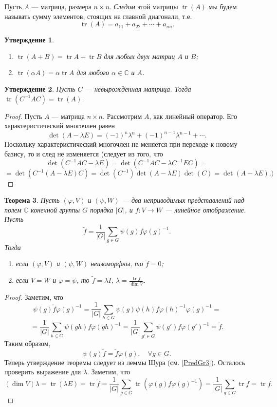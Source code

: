 \documentclass[12pt, titlepage, oneside]{amsbook}
\newcommand{\tr}{\operatorname{tr}}
\newcommand{\CC}{\mathbb{C}}
\newtheorem{theorem}{Теорема}[chapter]
\newtheorem{claim}[theorem]{Утверждение}
\theoremstyle{definition}
\theoremstyle{remark}
\begin{document}
Пусть $A$ --- матрица, размера $n\times n$. \emph{Следом} этой матрицы $\tr(A)$ мы будем называть сумму элементов, стоящих на главной диагонали, т.е. $$\tr(A)=a_{11}+a_{22}+\cdots+a_{nn}.$$

\begin{claim}
	\label{Tr1}
	\begin{enumerate}
		\item $\tr(A+B)=\tr A+\tr B$ для любых двух матриц $A$ и $B$;
		\item $\tr(\alpha A)=\alpha\tr A$ для любого $\alpha\in\CC$ и $A$.
	\end{enumerate}
\end{claim}

\begin{claim}
	\label{Tr2}
	Пусть $C$ --- невырожденная матрица. Тогда $\tr(C^{-1}AC)=\tr(A)$.
\end{claim}

\begin{proof}
	Пусть $A$ --- матрица $n\times n$. Рассмотрим $A$, как линейный оператор. Его характеристический многочлен равен $$\det(A-\lambda E)=(-1)^n\lambda^n+(-1)^{n-1}\lambda^{n-1}+\cdots.$$ Поскольку характеристический многочлен не меняется при переходе к новому базису, то и след не изменяется (следует из того, что $$\det(C^{-1}AC-\lambda E)=\det(C^{-1}AC-\lambda C^{-1}EC)=$$ $$=\det(C^{-1}(A-\lambda E)C)=\det(C^{-1})\det(A-\lambda E)\det(C)=\det(A-\lambda E).)$$
\end{proof}

\begin{theorem}
	\label{PredGr4}
	Пусть $(\varphi,V)$ и $(\psi,W)$ --- два неприводимых представлений над полем $\CC$ конечной группы $G$ порядка $|G|$, и $f\colon V\rightarrow W$ --- линейное отображение. Пусть $$\tilde{f}=\frac{1}{|G|}\sum\limits_{g\in G}\psi(g)f\varphi(g)^{-1}.$$ Тогда \begin{enumerate}
		\item если $(\varphi,V)$ и $(\psi,W)$ неизоморфны, то $\tilde{f}=0$;
		\item если $V=W$ и $\varphi=\psi$, то $\tilde{f}=\lambda I$, $\lambda=\frac{\tr f}{\dim V}$.
	\end{enumerate}
\end{theorem}

\begin{proof}
	Заметим, что $$\psi(g)\tilde{f}\varphi(g)^{-1}=\frac{1}{|G|}\sum\limits_{h\in G}\psi(g)\psi(h)f\varphi(h)^{-1}\varphi(g)^{-1}=$$ $$=\frac{1}{|G|}\sum\limits_{h\in G}\psi(gh)f\varphi(gh)^{-1}=\frac{1}{|G|}\sum\limits_{g'\in G}\psi(g')f\varphi(g')^{-1}=\tilde{f}.$$ Таким образом, $$\psi(g)\tilde{f}=\tilde{f}\varphi(g),\quad \forall g\in G.$$ Теперь утверждение теоремы следует из леммы Шура (см. \ref{PredGr3}). Осталось проверить выражение для $\lambda$. Заметим, что $$(\dim V)\lambda=\tr(\lambda E)=\tr\tilde{f}=\frac{1}{|G|}\sum\limits_{g\in G}\tr(\varphi(g)f\varphi(g)^{-1})=\frac{1}{|G|}\sum\limits_{g\in G}\tr f=\tr f.$$
\end{proof}
\end{document}
